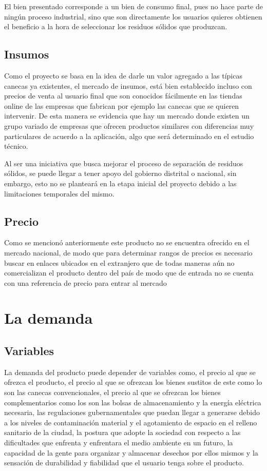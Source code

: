 \documentclass[letterpaper,12pt]{scrreprt}
\begin{document}
    El bien presentado corresponde a un bien de consumo final, pues no hace parte de ningún proceso industrial, sino que son directamente los usuarios quieres obtienen el beneficio a la hora de seleccionar los residuos sólidos que produzcan.

    \section{Insumos}

    Como el proyecto se basa en la idea de darle un valor agregado a las típicas canecas ya existentes, el mercado de insumos, está bien establecido incluso con precios de venta al usuario final que son conocidos fácilmente en las tiendas online de las empresas que fabrican por ejemplo las canecas que se quieren intervenir. De esta manera se evidencia que hay un mercado donde existen un grupo variado de empresas que ofrecen productos similares con diferencias muy particulares de acuerdo a la aplicación, algo que será determinado en el estudio técnico.

    Al ser una iniciativa que busca mejorar el proceso de separación de residuos sólidos, se puede llegar a tener apoyo del gobierno distrital o nacional, sin embargo, esto no se planteará en la etapa inicial del proyecto debido a las limitaciones temporales del mismo.

    \section{Precio}
Como se mencionó anteriormente este producto no se encuentra ofrecido en el mercado nacional, de modo que para determinar rangos de precios es necesario buscar en enlaces ubicados en el extranjero que de todas maneras aún no comercializan el producto dentro del país de modo que de entrada no se cuenta con una referencia de precio para entrar al mercado


\chapter{La demanda}

    \section{Variables}
    La demanda del producto puede depender de variables como, el precio al que se ofrezca el producto, el precio al que se ofrezcan los bienes sustitos de este como lo son las canecas convencionales, el precio al que se ofrezcan los bienes complementarios como los son las bolsas de almacenamiento y la energía eléctrica necesaria,  las regulaciones gubernamentales que puedan llegar a generarse debido a los niveles de contaminación material y el agotamiento de espacio en el relleno sanitario de la ciudad,  la postura que adopte la sociedad con respecto a las dificultades que enfrenta y enfrentara el medio ambiente en un futuro, la capacidad de la gente para organizar y almacenar desechos por ellos mismos y la sensación de durabilidad y fiabilidad que el usuario tenga sobre el producto.
\end{document}
